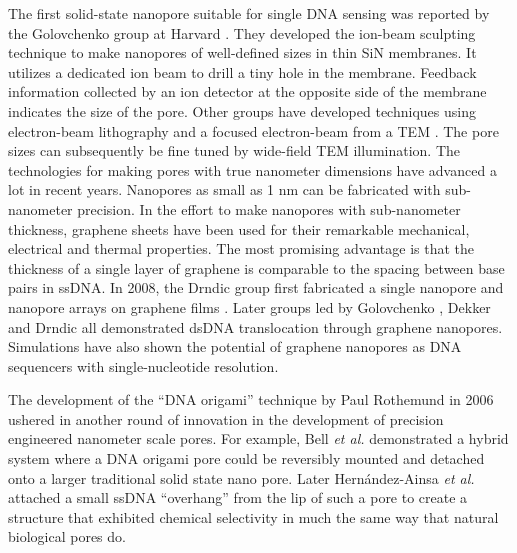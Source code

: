 The first solid-state nanopore suitable for single DNA sensing was reported by the Golovchenko group at Harvard \cite{Li2001}. They developed the ion-beam sculpting technique to make nanopores of well-defined sizes in thin SiN membranes. It utilizes a dedicated ion beam to drill a tiny hole in the membrane. Feedback information collected by an ion detector at the opposite side of the membrane indicates the size of the pore. Other groups have developed techniques using electron-beam lithography and a focused electron-beam from a TEM \cite{Dekker2003}. The pore sizes can subsequently be fine tuned by wide-field TEM illumination. The technologies for making pores with true nanometer dimensions have advanced a lot in recent years. Nanopores as small as 1 nm can be fabricated with sub-nanometer precision. In the effort to make nanopores with sub-nanometer thickness, graphene sheets have been used for their remarkable mechanical, electrical and thermal properties. The most promising advantage is that the thickness of a single layer of graphene is comparable to the spacing between base pairs in ssDNA. In 2008, the Drndic group first fabricated a single nanopore and nanopore arrays on graphene films \cite{fischbein2008electron}. Later groups led by Golovchenko \cite{Garaj2010}, Dekker \cite{Schneider2010} and Drndic \cite{Merchant2010} all demonstrated dsDNA translocation through graphene nanopores. Simulations have also shown the potential of graphene nanopores as DNA sequencers with single-nucleotide resolution. 

The development  of the ``DNA origami'' technique by Paul Rothemund in 2006 \cite{rothemund2006folding} ushered in another round of innovation in the development of precision engineered nanometer scale pores. For example, Bell {\it et al.} \cite{bell2011dna} demonstrated a hybrid system where a DNA origami pore could be reversibly mounted and detached onto a larger traditional solid state nano pore. Later Hern\'{a}ndez-Ainsa {\it et al.} \cite{hernandez2013dna} attached a small ssDNA “overhang” from the lip of such a pore to create a structure that exhibited chemical selectivity in much the same way that natural biological pores do. 
 
